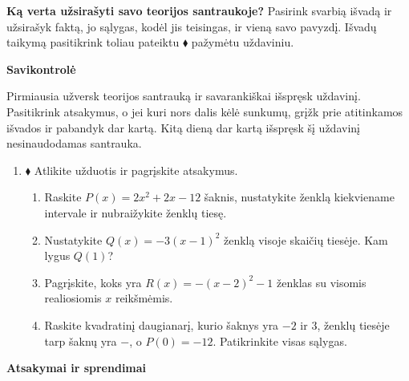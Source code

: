\documentclass[12pt,a4paper]{article}
\begin{document}
\textbf{Ką verta užsirašyti savo teorijos santraukoje?} Pasirink svarbią išvadą ir užsirašyk faktą, jo sąlygas, kodėl jis teisingas, ir vieną savo pavyzdį. Išvadų taikymą pasitikrink toliau pateiktu $\blacklozenge$ pažymėtu uždaviniu.
\newpage
\begin{center}{\Large\bfseries Savikontrolė}\end{center}
Pirmiausia užversk teorijos santrauką ir savarankiškai išspręsk uždavinį. Pasitikrink atsakymus, o jei kuri nors dalis kėlė sunkumų, grįžk prie atitinkamos išvados ir pabandyk dar kartą. Kitą dieną dar kartą išspręsk šį uždavinį nesinaudodamas santrauka.
\begin{enumerate}[resume=uzdaviniai]
\item $\blacklozenge$ Atlikite užduotis ir pagrįskite atsakymus.
\begin{enumerate}
\item Raskite $P(x)=2x^2+2x-12$ šaknis, nustatykite ženklą kiekviename intervale ir nubraižykite ženklų tiesę.
\item Nustatykite $Q(x)=-3(x-1)^2$ ženklą visoje skaičių tiesėje. Kam lygus $Q(1)$?
\item Pagrįskite, koks yra $R(x)=-(x-2)^2-1$ ženklas su visomis realiosiomis $x$ reikšmėmis.
\item Raskite kvadratinį daugianarį, kurio šaknys yra $-2$ ir $3$, ženklų tiesėje tarp šaknų yra $-$, o $P(0)=-12$. Patikrinkite visas sąlygas.
\end{enumerate}
\end{enumerate}
\newpage
\begin{center}{\Large\bfseries Atsakymai ir sprendimai}\end{center}
\end{document}
